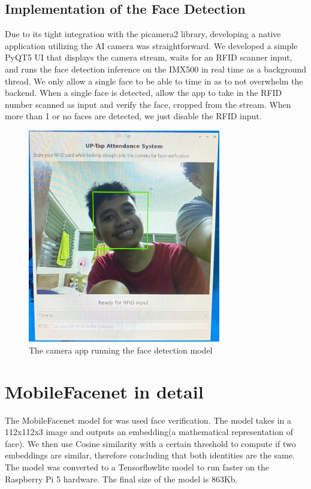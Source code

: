 \subsection{Implementation of the Face Detection}
Due to its tight integration with the picamera2 library, developing a native application utilizing the AI camera was straightforward. We developed a simple PyQT5 UI that displays the camera stream, waits for an RFID scanner input, and runs the face detection inference on the IMX500 in real time as a background thread. We only allow a single face to be able to time in as to not overwhelm the backend. When a single face is detected, allow the app to take in the RFID number scanned as input and verify the face, cropped from the stream. When more than 1 or no faces are detected, we just disable the RFID input.
\begin{figure}[h] %
	\centering
	\includegraphics[width=0.75\textwidth]{figures/chapter4/ai_cam_app.png} %
	\caption{The camera app running the face detection model}
	\label{fig:ai_cam_app}
\end{figure}
\section{MobileFacenet in detail}
The MobileFacenet model for was used face verification. The model takes in a 112x112x3 image and outputs an embedding(a mathematical representation of face). We then use Cosine similarity with a certain threshold to compute if two embeddings are similar, therefore concluding that both identities are the same. The model was converted to a Tensorflowlite model to run faster on the Raspberry Pi 5 hardware. The final size of the model is 863Kb.

